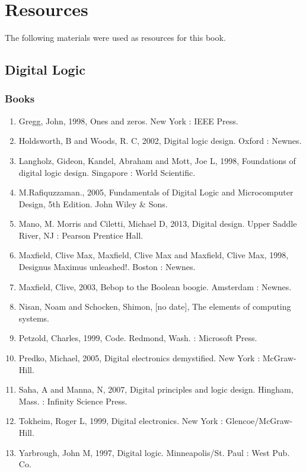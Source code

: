 \chapter{Resources}
\label{ap:ch:resources}

The following materials were used as resources for this book.

\section{Digital Logic}
\subsection{Books}

\begin{enumerate}
  \item Gregg, John, 1998, Ones and zeros. New York : IEEE Press.
  \item Holdsworth, B and Woods, R. C, 2002, Digital logic design. Oxford : Newnes.
  \item Langholz, Gideon, Kandel, Abraham and Mott, Joe L, 1998, Foundations of digital logic design. Singapore : World Scientific.
  \item M.Rafiquzzaman., 2005, Fundamentals of Digital Logic and Microcomputer Design, 5th Edition. John Wiley \& Sons.
  \item Mano, M. Morris and Ciletti, Michael D, 2013, Digital design. Upper Saddle River, NJ : Pearson Prentice Hall.
  \item Maxfield, Clive Max, Maxfield, Clive Max and Maxfield, Clive Max, 1998, Designus Maximus unleashed!. Boston : Newnes.
  \item Maxfield, Clive, 2003, Bebop to the Boolean boogie. Amsterdam : Newnes.
  \item Nisan, Noam and Schocken, Shimon, [no date], The elements of computing systems.
  \item Petzold, Charles, 1999, Code. Redmond, Wash. : Microsoft Press.
  \item Predko, Michael, 2005, Digital electronics demystified. New York : McGraw-Hill.
  \item Saha, A and Manna, N, 2007, Digital principles and logic design. Hingham, Mass. : Infinity Science Press.
  \item Tokheim, Roger L, 1999, Digital electronics. New York : Glencoe/McGraw-Hill.
  \item Yarbrough, John M, 1997, Digital logic. Minneapolis/St. Paul : West Pub. Co.
\end{enumerate}

